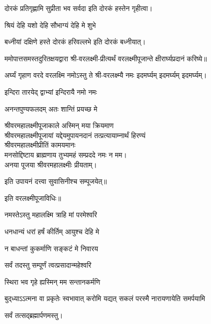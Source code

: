 \begin{center}
{दोरकं प्रतिगृह्णामि सुप्रीता भव सर्वदा} 
इति दोरकं हस्तेन गृहीत्वा।


{श्रियं देहि यशो देहि सौभाग्यं देहि मे शुभे}

{बध्नीयां दक्षिणे हस्ते दोरकं हरिवल्लभे}
इति दोरकं बध्नीयात्।


ममोपात्तसमस्तदुरितक्षयद्वारा श्री-वरलक्ष्मी-प्रीत्यर्थं वरलक्ष्मीपूजान्ते क्षीरार्घ्यप्रदानं करिष्ये॥

{अर्घ्यं गृहाण वरदे वरलक्ष्मि नमोऽस्तु ते} 
श्री-वरलक्ष्म्यै नमः इदमर्घ्यम् इदमर्घ्यम् इदमर्घ्यम्।


{इन्दिरा तारयेद् द्वाभ्यां इन्दिरायै नमो नमः}

{अनन्तपुण्यफलदम् अतः शान्तिं प्रयच्छ मे}

श्रीवरमहालक्ष्मीपूजाकाले अस्मिन् मया क्रियमाण\\
श्रीवरमहालक्ष्मीपूजायां यद्देयमुपायनदानं तत्प्रत्यायाम्नार्थं हिरण्यं\\
श्रीवरमहालक्ष्मीप्रीतिं कामयमानः\\
मनसोद्दिष्टाय ब्राह्मणाय तुभ्यमहं सम्प्रददे नमः न मम।\\ 
अनया पूजया श्रीवरमहालक्ष्मीः प्रीयताम्। 

इति उपायनं दत्त्वा सुवासिनीश्च सम्पूजयेत्॥


इति वरलक्ष्मीपूजाविधिः॥

\end{center}





{नमस्तेऽस्तु महालक्ष्मि त्राहि मां परमेश्वरि}

{धनधान्यं धरां हर्षं कीर्तिम् आयुश्च देहि मे}

{न बाधन्तां कुकर्माणि सङ्कटं मे निवारय}






{सर्वं तदस्तु सम्पूर्णं त्वत्प्रसादान्महेश्वरि}

{स्थिरा भव गृहे ह्यस्मिन् मम सन्तानकर्मणि}


{बुद्‌ध्याऽऽत्मना वा प्रकृतेः स्वभावात्}
{करोमि यद्यत् सकलं परस्मै}
{नारायणायेति समर्पयामि}

सर्वं तत्सद्ब्रह्मार्पणमस्तु।


